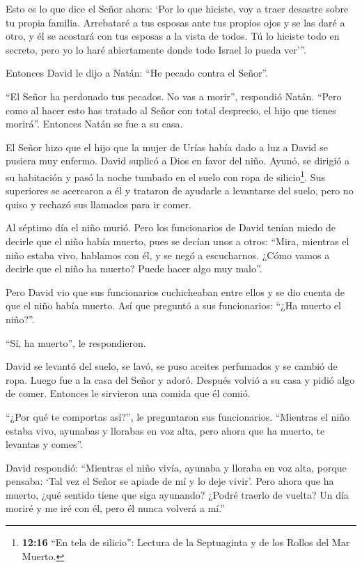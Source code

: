  Esto es lo que dice el Señor ahora: `Por lo que hiciste,
voy a traer desastre sobre tu propia familia. Arrebataré a tus esposas
ante tus propios ojos y se las daré a otro, y él se acostará con tus
esposas a la vista de todos.  Tú lo hiciste todo en
secreto, pero yo lo haré abiertamente donde todo Israel lo pueda ver'''.

 Entonces David le dijo a Natán: ``He pecado contra el
Señor''.

``El Señor ha perdonado tus pecados. No vas a morir'', respondió Natán.
 ``Pero como al hacer esto has tratado al Señor con total
desprecio, el hijo que tienes morirá''.  Entonces Natán se
fue a su casa.

El Señor hizo que el hijo que la mujer de Urías había dado a luz a David
se pusiera muy enfermo.  David suplicó a Dios en favor del
niño. Ayunó, se dirigió a su habitación y pasó la noche tumbado en el
suelo con ropa de silicio\footnote{\textbf{12:16} ``En tela de
  silicio'': Lectura de la Septuaginta y de los Rollos del Mar Muerto.}.
 Sus superiores se acercaron a él y trataron de ayudarle a
levantarse del suelo, pero no quiso y rechazó sus llamados para ir
comer.

 Al séptimo día el niño murió. Pero los funcionarios de
David tenían miedo de decirle que el niño había muerto, pues se decían
unos a otros: ``Mira, mientras el niño estaba vivo, hablamos con él, y
se negó a escucharnos. ¿Cómo vamos a decirle que el niño ha muerto?
Puede hacer algo muy malo''.

 Pero David vio que sus funcionarios cuchicheaban entre
ellos y se dio cuenta de que el niño había muerto. Así que preguntó a
sus funcionarios: ``¿Ha muerto el niño?''.

``Sí, ha muerto'', le respondieron.

 David se levantó del suelo, se lavó, se puso aceites
perfumados y se cambió de ropa. Luego fue a la casa del Señor y adoró.
Después volvió a su casa y pidió algo de comer. Entonces le sirvieron
una comida que él comió.

 ``¿Por qué te comportas así?'', le preguntaron sus
funcionarios. ``Mientras el niño estaba vivo, ayunabas y llorabas en voz
alta, pero ahora que ha muerto, te levantas y comes''.

 David respondió: ``Mientras el niño vivía, ayunaba y
lloraba en voz alta, porque pensaba: `Tal vez el Señor se apiade de mí y
lo deje vivir'.  Pero ahora que ha muerto, ¿qué sentido
tiene que siga ayunando? ¿Podré traerlo de vuelta? Un día moriré y me
iré con él, pero él nunca volverá a mí.''

